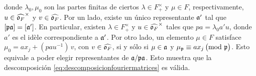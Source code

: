 %
donde $\lambda_{0},\mu_{0}$ son las partes finitas de ciertos
$\lambda\in F^{\times}_{+}$ y $\mu\in F$, respectivamente,
$u\in\Idfin{\oka{F}}$ y $v\in\Adfin{\oka{F}}$. Por un lado, existe un \'{u}nico
representante $\frak{a}'$ tal que $[\frak{p}\frak{a}]=[\frak{a}']$. En
particular, existen $\lambda\in F_{+}^{\times}$ y $u\in\Idfin{\oka{F}}$ tales
que $pa=\lambda_{0}a'u$, donde $a'$ es el id\`{e}le correspondiente a
$\frak{a}'$.
Por otro lado, un elemento $\mu\in F$ satisface
$\mu_{0}=ax_{j}+(pau^{-1})\,v$, con $v\in\Adfin{\oka{F}}$, si y s\'{o}lo si
$\mu\in\frak{a}$ y $\mu_{\frak{p}}\equiv ax_{j}\,\big(\modulo\,\frak{p}\big)$.
Esto equivale a poder elegir representantes de $\frak{a}/\frak{p}\frak{a}$.
Esto muestra que la descomposici\'{o}n
\eqref{eq:descomposicionfouriermatrices} es v\'{a}lida.

